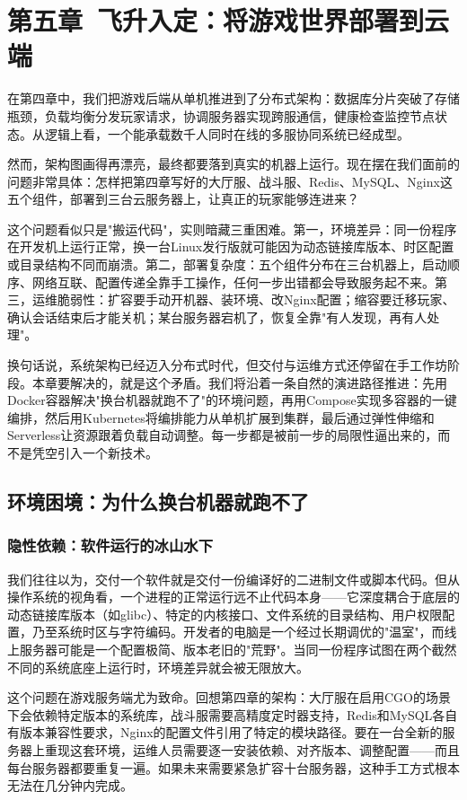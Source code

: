 \section{第五章\ 飞升入定：将游戏世界部署到云端}

在第四章中，我们把游戏后端从单机推进到了分布式架构：数据库分片突破了存储瓶颈，负载均衡分发玩家请求，协调服务器实现跨服通信，健康检查监控节点状态。从逻辑上看，一个能承载数千人同时在线的多服协同系统已经成型。

然而，架构图画得再漂亮，最终都要落到真实的机器上运行。现在摆在我们面前的问题非常具体：怎样把第四章写好的大厅服、战斗服、Redis、MySQL、Nginx这五个组件，部署到三台云服务器上，让真正的玩家能够连进来？

这个问题看似只是"搬运代码"，实则暗藏三重困难。第一，环境差异：同一份程序在开发机上运行正常，换一台Linux发行版就可能因为动态链接库版本、时区配置或目录结构不同而崩溃。第二，部署复杂度：五个组件分布在三台机器上，启动顺序、网络互联、配置传递全靠手工操作，任何一步出错都会导致服务起不来。第三，运维脆弱性：扩容要手动开机器、装环境、改Nginx配置；缩容要迁移玩家、确认会话结束后才能关机；某台服务器宕机了，恢复全靠"有人发现，再有人处理"。

换句话说，系统架构已经迈入分布式时代，但交付与运维方式还停留在手工作坊阶段。本章要解决的，就是这个矛盾。我们将沿着一条自然的演进路径推进：先用Docker容器解决"换台机器就跑不了"的环境问题，再用Compose实现多容器的一键编排，然后用Kubernetes将编排能力从单机扩展到集群，最后通过弹性伸缩和Serverless让资源跟着负载自动调整。每一步都是被前一步的局限性逼出来的，而不是凭空引入一个新技术。

\subsection{环境困境：为什么换台机器就跑不了}

\subsubsection{隐性依赖：软件运行的冰山水下}

我们往往以为，交付一个软件就是交付一份编译好的二进制文件或脚本代码。但从操作系统的视角看，一个进程的正常运行远不止代码本身——它深度耦合于底层的动态链接库版本（如glibc）、特定的内核接口、文件系统的目录结构、用户权限配置，乃至系统时区与字符编码。开发者的电脑是一个经过长期调优的"温室"，而线上服务器可能是一个配置极简、版本老旧的"荒野"。当同一份程序试图在两个截然不同的系统底座上运行时，环境差异就会被无限放大。

这个问题在游戏服务端尤为致命。回想第四章的架构：大厅服在启用CGO的场景下会依赖特定版本的系统库，战斗服需要高精度定时器支持，Redis和MySQL各自有版本兼容性要求，Nginx的配置文件引用了特定的模块路径。要在一台全新的服务器上重现这套环境，运维人员需要逐一安装依赖、对齐版本、调整配置——而且每台服务器都要重复一遍。如果未来需要紧急扩容十台服务器，这种手工方式根本无法在几分钟内完成。

